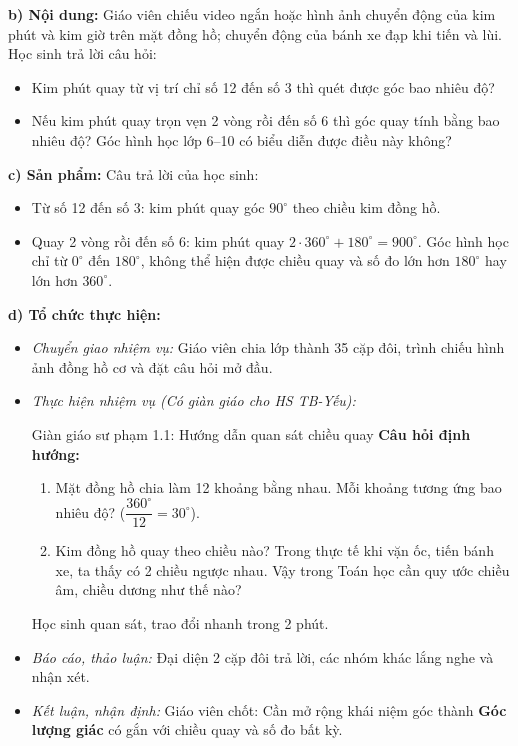 \documentclass[12pt, a4paper]{article}
\begin{document}
\textbf{b) Nội dung:} Giáo viên chiếu video ngắn hoặc hình ảnh chuyển động của kim phút và kim giờ trên mặt đồng hồ; chuyển động của bánh xe đạp khi tiến và lùi. Học sinh trả lời câu hỏi:
\begin{itemize}[leftmargin=0.6cm]
    \item Kim phút quay từ vị trí chỉ số 12 đến số 3 thì quét được góc bao nhiêu độ?
    \item Nếu kim phút quay trọn vẹn 2 vòng rồi đến số 6 thì góc quay tính bằng bao nhiêu độ? Góc hình học lớp 6--10 có biểu diễn được điều này không?
\end{itemize}

\textbf{c) Sản phẩm:} Câu trả lời của học sinh:
\begin{itemize}[leftmargin=0.6cm]
    \item Từ số 12 đến số 3: kim phút quay góc $90^\circ$ theo chiều kim đồng hồ.
    \item Quay 2 vòng rồi đến số 6: kim phút quay $2 \cdot 360^\circ + 180^\circ = 900^\circ$. Góc hình học chỉ từ $0^\circ$ đến $180^\circ$, không thể hiện được chiều quay và số đo lớn hơn $180^\circ$ hay lớn hơn $360^\circ$.
\end{itemize}

\textbf{d) Tổ chức thực hiện:}
\begin{itemize}[leftmargin=0.6cm]
    \item \textit{Chuyển giao nhiệm vụ:} Giáo viên chia lớp thành 35 cặp đôi, trình chiếu hình ảnh đồng hồ cơ và đặt câu hỏi mở đầu.
    \item \textit{Thực hiện nhiệm vụ (Có giàn giáo cho HS TB-Yếu):}
    \begin{scaffoldbox}{Giàn giáo sư phạm 1.1: Hướng dẫn quan sát chiều quay}
        \textbf{Câu hỏi định hướng:}
        \begin{enumerate}[leftmargin=0.5cm]
            \item Mặt đồng hồ chia làm 12 khoảng bằng nhau. Mỗi khoảng tương ứng bao nhiêu độ? ($\dfrac{360^\circ}{12} = 30^\circ$).
            \item Kim đồng hồ quay theo chiều nào? Trong thực tế khi vặn ốc, tiến bánh xe, ta thấy có 2 chiều ngược nhau. Vậy trong Toán học cần quy ước chiều âm, chiều dương như thế nào?
        \end{enumerate}
    \end{scaffoldbox}
    Học sinh quan sát, trao đổi nhanh trong 2 phút.
    \item \textit{Báo cáo, thảo luận:} Đại diện 2 cặp đôi trả lời, các nhóm khác lắng nghe và nhận xét.
    \item \textit{Kết luận, nhận định:} Giáo viên chốt: Cần mở rộng khái niệm góc thành \textbf{Góc lượng giác} có gắn với chiều quay và số đo bất kỳ.
\end{itemize}
\end{document}
